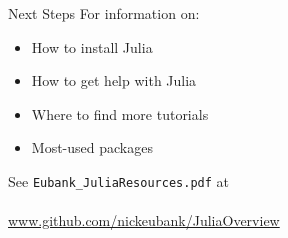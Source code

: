 \documentclass[11pt]{beamer}
\begin{document}
\begin{frame}[c]{Next Steps}
For information on:
\begin{itemize}
    \item How to install Julia
    \item How to get help with Julia
    \item Where to find more tutorials
    \item Most-used packages
\end{itemize}
See \texttt{Eubank\_JuliaResources.pdf} at \\
\vspace*{0.2cm} \\
\url{www.github.com/nickeubank/JuliaOverview}
\end{frame}
\end{document}
